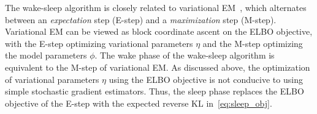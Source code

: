 The wake-sleep algorithm is closely related to variational EM~\citep{Jordan_intro_vi, neal2000varem, Beal2002varem}, 
which alternates between an {\itshape expectation} step (E-step) and a {\itshape maximization} step (M-step). 
Variational EM can be viewed as block coordinate ascent on the ELBO objective, with the E-step optimizing variational parameters $\eta$ and the M-step optimizing the model parameters $\phi$. 
The wake phase of the wake-sleep algorithm is equivalent to the M-step of variational EM. 
As discussed above, the optimization of variational parameters $\eta$ using the ELBO objective is not conducive to using simple stochastic gradient estimators.
Thus, the sleep phase replaces the ELBO objective of the E-step with the expected reverse KL in~\eqref{eq:sleep_obj}.




